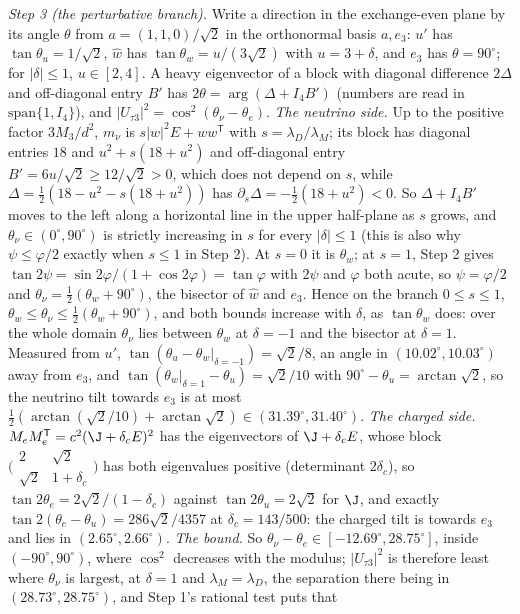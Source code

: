 \emph{Step 3 (the perturbative branch).} Write a direction in the exchange-even plane by its angle $\theta$ from $a = (1,1,0)/\sqrt{2}$ in the orthonormal basis $a, e_{3}$: $u'$ has $\tan\theta_{u} = 1/\sqrt{2}$, $\hat{w}$ has $\tan\theta_{w} = u/(3\sqrt{2})$ with $u = 3 + \delta$, and $e_{3}$ has $\theta = 90^{\circ}$; for $|\delta| \le 1$, $u \in [2, 4]$. A heavy eigenvector of a block with diagonal difference $2\Delta$ and off-diagonal entry $B'$ has $2\theta = \arg(\Delta + I_{4}B')$ (numbers are read in $\mathrm{span}\{1, I_{4}\}$), and $|U_{\tau 3}|^{2} = \cos^{2}(\theta_{\nu} - \theta_{e})$. \emph{The neutrino side.} Up to the positive factor $3M_{3}/d^{2}$, $m_{\nu}$ is $s|w|^{2}E + ww^{\mathsf{T}}$ with $s = \lambda_{D}/\lambda_{M}$; its block has diagonal entries $18$ and $u^{2} + s(18 + u^{2})$ and off-diagonal entry $B' = 6u/\sqrt{2} \ge 12/\sqrt{2} > 0$, which does not depend on $s$, while $\Delta = \tfrac12(18 - u^{2} - s(18 + u^{2}))$ has $\partial_{s}\Delta = -\tfrac12(18 + u^{2}) < 0$. So $\Delta + I_{4}B'$ moves to the left along a horizontal line in the upper half-plane as $s$ grows, and $\theta_{\nu} \in (0^{\circ}, 90^{\circ})$ is strictly increasing in $s$ for every $|\delta| \le 1$ (this is also why $\psi \le \varphi/2$ exactly when $s \le 1$ in Step 2). At $s = 0$ it is $\theta_{w}$; at $s = 1$, Step 2 gives $\tan 2\psi = \sin 2\varphi/(1 + \cos 2\varphi) = \tan\varphi$ with $2\psi$ and $\varphi$ both acute, so $\psi = \varphi/2$ and $\theta_{\nu} = \tfrac12(\theta_{w} + 90^{\circ})$, the bisector of $\hat{w}$ and $e_{3}$. Hence on the branch $0 \le s \le 1$, $\theta_{w} \le \theta_{\nu} \le \tfrac12(\theta_{w} + 90^{\circ})$, and both bounds increase with $\delta$, as $\tan\theta_{w}$ does: over the whole domain $\theta_{\nu}$ lies between $\theta_{w}$ at $\delta = -1$ and the bisector at $\delta = 1$. Measured from $u'$, $\tan(\theta_{u} - \theta_{w}|_{\delta = -1}) = \sqrt{2}/8$, an angle in $(10.02^{\circ}, 10.03^{\circ})$ away from $e_{3}$, and $\tan(\theta_{w}|_{\delta = 1} - \theta_{u}) = \sqrt{2}/10$ with $90^{\circ} - \theta_{u} = \arctan\sqrt{2}$, so the neutrino tilt towards $e_{3}$ is at most $\tfrac12(\arctan(\sqrt{2}/10) + \arctan\sqrt{2}) \in (31.39^{\circ}, 31.40^{\circ})$. \emph{The charged side.} $M_{e}M_{e}^{\mathsf{T}} = c^{2}(\J + \delta_{c}E)^{2}$ has the eigenvectors of $\J + \delta_{c}E$, whose block $\bigl(\begin{smallmatrix} 2 & \sqrt{2} \\ \sqrt{2} & 1 + \delta_{c} \end{smallmatrix}\bigr)$ has both eigenvalues positive (determinant $2\delta_{c}$), so $\tan 2\theta_{e} = 2\sqrt{2}/(1 - \delta_{c})$ against $\tan 2\theta_{u} = 2\sqrt{2}$ for $\J$, and exactly $\tan 2(\theta_{e} - \theta_{u}) = 286\sqrt{2}/4357$ at $\delta_{c} = 143/500$: the charged tilt is towards $e_{3}$ and lies in $(2.65^{\circ}, 2.66^{\circ})$. \emph{The bound.} So $\theta_{\nu} - \theta_{e} \in [-12.69^{\circ}, 28.75^{\circ}]$, inside $(-90^{\circ}, 90^{\circ})$, where $\cos^{2}$ decreases with the modulus; $|U_{\tau 3}|^{2}$ is therefore least where $\theta_{\nu}$ is largest, at $\delta = 1$ and $\lambda_{M} = \lambda_{D}$, the separation there being in $(28.73^{\circ}, 28.75^{\circ})$, and Step 1's rational test puts that 